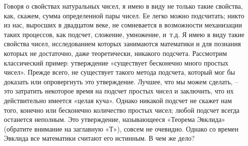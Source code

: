 \documentclass[../main.tex]{subfiles}
\begin{document}
Говоря о свойствах натуральных чисел, я имею в виду не только такие свойства, как, скажем, сумма определенной пары чисел. Ее легко можно подсчитать; никто из нас, выросших в двадцатом веке, не сомневается в возможности механизации таких процессов, как подсчет, сложение, умножение, и~т.д. Я имею в виду такие свойства чисел, исследованием которых занимаются математики и для познания которых не достаточно, даже теоретически, никакого подсчета. Рассмотрим классический пример: утверждение «существует бесконечно много простых чисел». Прежде всего, не существует такого метода подсчета, который мог бы доказать или опровергнуть это утверждение. Лучшее, что мы можем сделать, \--- это затратить некоторое время на подсчет простых чисел и заключить, что их действительно имеется «целая куча». Однако никакой подсчет не скажет нам того, конечно или бесконечно количество простых чисел; любой подсчет всегда останется неполным. Это утверждение, называющееся «Теорема Эвклида» (обратите внимание на заглавную «Т»), совсем не очевидно. Однако со времен Эвклида все математики считают его истинным. В чем же дело?
\end{document}
